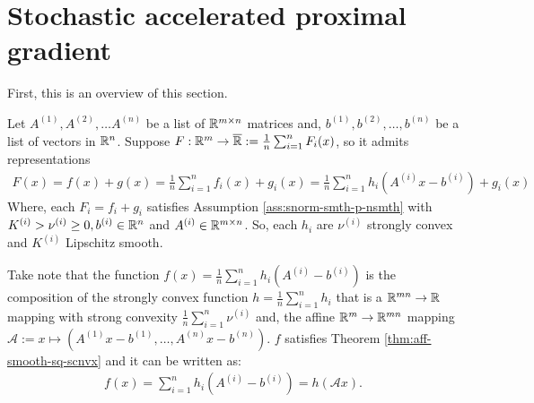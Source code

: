 \documentclass[12pt]{article}
\begin{document}
\section{Stochastic accelerated proximal gradient}
    First, this is an overview of this section. 

    \begin{assumption}\label{ass:sum-of-many-aff-comp}
        Let $A^{(1)}, A^{(2)}, \ldots A^{(n)}$ be a list of $\mathbb R^{m\times n}$ matrices and, $b^{(1)}, b^{(2)}, \ldots, b^{(n)}$ be a list of vectors in $\mathbb R^n$. 
        Suppose $F:\mathbb R^m \rightarrow \overline {\mathbb R}:= \frac{1}{n}\sum_{i = 1}^{n} F_i(x)$, so it admits representations 
        \begin{align*}
            F(x) = f(x) + g(x) = \frac{1}{n}\sum_{i = 1}^{n} f_i(x) + g_i(x) = \frac{1}{n}\sum_{i = 1}^{n} h_i(A^{(i)}x - b^{(i)}) + g_i(x)
        \end{align*}
        Where, each $F_i = f_i + g_i$ satisfies Assumption \ref{ass:snorm-smth-p-nsmth} with $K^{(i)} > \nu^{(i)} \ge 0, b^{(i)} \in \mathbb R^n$ and $A^{(i)} \in \mathbb R^{m \times n}$. 
        So, each $h_i$ are $\nu^{(i)}$ strongly convex and $K^{(i)}$ Lipschitz smooth. 
        \par
        Take note that the function $f(x) = \frac{1}{n}\sum_{i = 1}^{n} h_i(A^{(i)} - b^{(i)})$ is the composition of the strongly convex function $h = \frac{1}{n}\sum_{i = 1}^{n} h_i$ that is a $\mathbb R^{mn}\rightarrow \mathbb R$ mapping with strong convexity $\frac{1}{n}\sum_{i = 1}^{n} \nu^{(i)}$ and, the affine $\mathbb R^m \rightarrow \mathbb R^{mn}$ mapping $\mathcal A := x \mapsto (A^{(1)}x - b^{(1)},\ldots,  A^{(n)}x - b^{(n)})$. 
        $f$ satisfies Theorem \ref{thm:aff-smooth-sq-scnvx} and it can be written as: 
        \begin{align*}
            f(x) = \sum_{i = 1}^{n} h_i(A^{(i)} - b^{(i)}) = h(\mathcal A x). 
        \end{align*}
    \end{assumption}
\end{document}
